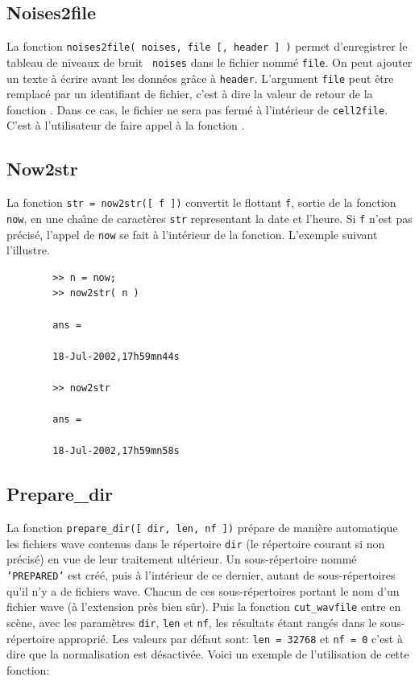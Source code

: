     \bigskip
    \subsection{Noises2file}
    \label{noises2file}
    La fonction {\tt noises2file( noises, file [, header ] )}
    permet d'enregistrer le tableau de niveaux de bruit {\tt
    noises} dans le fichier nomm{\'e} {\tt file}. On peut ajouter un
    texte {\`a} {\'e}crire avant les donn{\'e}es gr{\^a}ce {\`a} {\tt header}.
    L'argument {\tt file} peut {\^e}tre remplac{\'e} par un
    identifiant de fichier, c'est {\`a} dire la valeur de retour de la
    fonction . Dans ce cas, le fichier ne sera
    pas ferm{\'e} {\`a} l'int{\'e}rieur de {\tt cell2file}. C'est {\`a}
    l'utilisateur de faire appel {\`a} la fonction .


    \bigskip
    \subsection{Now2str}
    \label{now2str}
    La fonction {\tt str = now2str([ f ])}
    convertit le flottant {\tt f}, sortie de la fonction \matlab
    {\tt now}, en une cha{\^\i}ne de caract{\`e}res {\tt str} representant la date
    et l'heure. Si {\tt f} n'est pas pr{\'e}cis{\'e}, l'appel de {\tt now}
    se fait {\`a} l'int{\'e}rieur de la fonction. L'exemple suivant l'illustre.

    \begin{verbatim}
        >> n = now;
        >> now2str( n )

        ans =

        18-Jul-2002,17h59mn44s

        >> now2str

        ans =

        18-Jul-2002,17h59mn58s
    \end{verbatim}


    \newpage
    \subsection{Prepare\_dir}
    \label{preparedir}
    La fonction {\tt prepare\_dir([ dir, len, nf ])} pr{\'e}pare de
    mani{\`e}re automatique les fichiers wave contenus dans le
    r{\'e}pertoire {\tt dir} (le r{\'e}pertoire courant si non pr{\'e}cis{\'e})
    en vue de leur traitement ult{\'e}rieur. Un
    sous-r{\'e}pertoire nomm{\'e} {\tt 'PREPARED'} est cr{\'e}{\'e}, puis {\`a}
    l'int{\'e}rieur de ce dernier, autant de sous-r{\'e}pertoires qu'il n'y
    a de fichiers wave. Chacun de ces sous-r{\'e}pertoires portant le
    nom d'un fichier wave ({\`a} l'extension pr{\`e}s bien s{\^u}r). Puis la
    fonction {\tt cut\_wavfile} entre en sc{\`e}ne, avec les
    param{\`e}tres {\tt dir}, {\tt len} et {\tt nf}, les r{\'e}sultats
    {\'e}tant rang{\'e}s dans le sous-r{\'e}pertoire appropri{\'e}. Les valeurs par
    d{\'e}faut sont: {\tt len = 32768} et {\tt nf = 0} c'est {\`a} dire
    que la normalisation est d{\'e}sactiv{\'e}e. Voici un
    exemple de l'utilisation de cette fonction:

